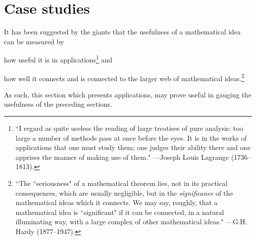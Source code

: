\section{Case studies}
It has been suggested by the giants that the usefulness of a mathematical idea can be measured by 
\begin{liste}
  \item how useful it is in applications\footnote{
    ``I regard as quite useless the reading of large treatises of pure analysis:
    too large a number of methods pass at once before the eyes.
    It is in the works of applications that one must study them;
    one judges their ability there and one apprises the manner of making use of them."
    ---Joseph Louis Lagrange (1736--1813).
    }
  and
  \item how well it connects and is connected to the larger web of mathematical ideas.\footnote{
    ``The ``seriousness" of a mathematical theorem lies,
    not in its practical consequences,
    which are usually negligible,
    but in the {\em significance} of the mathematical ideas which it connects.
    We may say, roughly, that a mathematical idea is ``significant" if it can be
    connected, in a natural illuminating way,
    with a large complex of other mathematical ideas."
    ---G.H. Hardy (1877--1947).
    }
\end{liste}

As such, this section which presents applications, 
may prove useful in gauging the usefulness of the preceding sections.